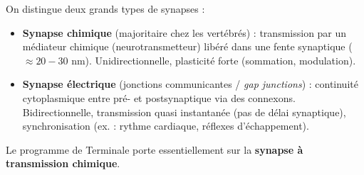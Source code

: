 \documentclass[11pt]{article}
\begin{document}
\begin{definition}
On distingue deux grands types de synapses :
\begin{itemize}
\item \textbf{Synapse chimique} (majoritaire chez les vertébrés) : transmission par un médiateur chimique (neurotransmetteur) libéré dans une fente synaptique ($\approx 20-30$ nm). Unidirectionnelle, plasticité forte (sommation, modulation).
\item \textbf{Synapse électrique} (jonctions communicantes / \emph{gap junctions}) : continuité cytoplasmique entre pré- et postsynaptique via des connexons. Bidirectionnelle, transmission quasi instantanée (pas de délai synaptique), synchronisation (ex. : rythme cardiaque, réflexes d'échappement).
\end{itemize}
Le programme de Terminale porte essentiellement sur la \textbf{synapse à transmission chimique}.
\end{definition}
\end{document}
